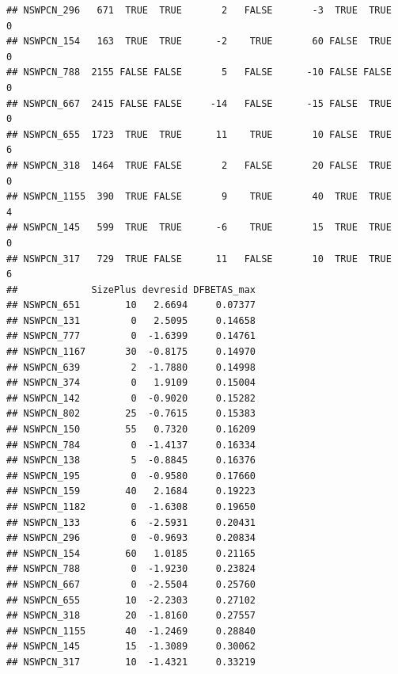 \documentclass{article}\usepackage[]{graphicx}\usepackage[]{color}
\makeatletter
\newenvironment{kframe}{%
 \def\at@end@of@kframe{}%
 \ifinner\ifhmode%
  \def\at@end@of@kframe{\end{minipage}}%
  \begin{minipage}{\columnwidth}%
 \fi\fi%
 \def\FrameCommand##1{\hskip\@totalleftmargin \hskip-\fboxsep
 \colorbox{shadecolor}{##1}\hskip-\fboxsep
     \hskip-\linewidth \hskip-\@totalleftmargin \hskip\columnwidth}%
 \MakeFramed {\advance\hsize-\width
   \@totalleftmargin\z@ \linewidth\hsize
   \@setminipage}}%
 {\par\unskip\endMakeFramed%
 \at@end@of@kframe}
\newenvironment{knitrout}{}{} %
\makeatother
\begin{document}
\begin{knitrout}
\begin{kframe}
\begin{verbatim}
## NSWPCN_296   671  TRUE  TRUE       2   FALSE       -3  TRUE  TRUE       0
## NSWPCN_154   163  TRUE  TRUE      -2    TRUE       60 FALSE  TRUE       0
## NSWPCN_788  2155 FALSE FALSE       5   FALSE      -10 FALSE FALSE       0
## NSWPCN_667  2415 FALSE FALSE     -14   FALSE      -15 FALSE  TRUE       0
## NSWPCN_655  1723  TRUE  TRUE      11    TRUE       10 FALSE  TRUE       6
## NSWPCN_318  1464  TRUE FALSE       2   FALSE       20 FALSE  TRUE       0
## NSWPCN_1155  390  TRUE FALSE       9    TRUE       40  TRUE  TRUE       4
## NSWPCN_145   599  TRUE  TRUE      -6    TRUE       15  TRUE  TRUE       0
## NSWPCN_317   729  TRUE FALSE      11   FALSE       10  TRUE  TRUE       6
##             SizePlus devresid DFBETAS_max
## NSWPCN_651        10   2.6694     0.07377
## NSWPCN_131         0   2.5095     0.14658
## NSWPCN_777         0  -1.6399     0.14761
## NSWPCN_1167       30  -0.8175     0.14970
## NSWPCN_639         2  -1.7880     0.14998
## NSWPCN_374         0   1.9109     0.15004
## NSWPCN_142         0  -0.9020     0.15282
## NSWPCN_802        25  -0.7615     0.15383
## NSWPCN_150        55   0.7320     0.16209
## NSWPCN_784         0  -1.4137     0.16334
## NSWPCN_138         5  -0.8845     0.16376
## NSWPCN_195         0  -0.9580     0.17660
## NSWPCN_159        40   2.1684     0.19223
## NSWPCN_1182        0  -1.6308     0.19650
## NSWPCN_133         6  -2.5931     0.20431
## NSWPCN_296         0  -0.9693     0.20834
## NSWPCN_154        60   1.0185     0.21165
## NSWPCN_788         0  -1.9230     0.23824
## NSWPCN_667         0  -2.5504     0.25760
## NSWPCN_655        10  -2.2303     0.27102
## NSWPCN_318        20  -1.8160     0.27557
## NSWPCN_1155       40  -1.2469     0.28840
## NSWPCN_145        15  -1.3089     0.30062
## NSWPCN_317        10  -1.4321     0.33219
\end{verbatim}
\end{kframe}
\end{knitrout}
\end{document}
